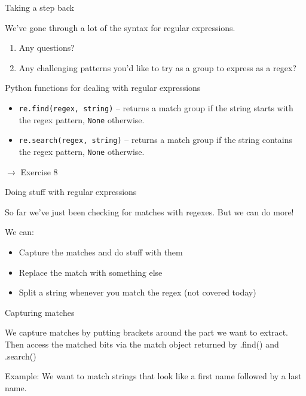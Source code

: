 \documentclass{beamer}
\begin{document}
\begin{frame}{Taking a step back}

We've gone through a lot of the syntax for regular expressions.

\begin{enumerate}
  \item Any questions?
  \item Any challenging patterns you'd like to try as a group to express as a regex?
\end{enumerate}
\end{frame}

\begin{frame}{Python functions for dealing with regular expressions}

\begin{itemize}
  \item \lstinline$re.find(regex, string)$ -- returns a match group if the string starts with the regex pattern, \lstinline$None$ otherwise.
  \item \lstinline$re.search(regex, string)$ -- returns a match group if the string contains the regex pattern, \lstinline$None$ otherwise.
\end{itemize}

\bigskip
$\rightarrow$ Exercise 8

\end{frame}

\begin{frame}{Doing stuff with regular expressions}

So far we've just been checking for matches with regexes. But we can do more!

\bigskip

We can:
\begin{itemize}
 \item Capture the matches and do stuff with them
 \item Replace the match with something else
 \item Split a string whenever you match the regex (not covered today)
\end{itemize}

\end{frame}

\begin{frame}{Capturing matches}

We capture matches by putting brackets around the part we want to extract.
Then access the matched bits via the match object returned by .find() and .search()

\bigskip

Example: We want to match strings that look like a first name followed by a last name.



\end{frame}
\end{document}
